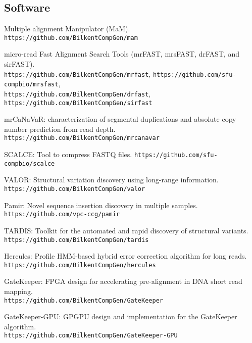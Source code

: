 \subsection{\small \sc Software}
\begin{list2}
\item
  Multiple alignment Manipulator (MaM).
  {\tt https://github.com/BilkentCompGen/mam}
\item
  micro-read Fast Alignment Search Tools (mrFAST, mrsFAST, drFAST, and sirFAST).\\
  {\tt https://github.com/BilkentCompGen/mrfast},
  {\tt https://github.com/sfu-compbio/mrsfast},\\
  {\tt https://github.com/BilkentCompGen/drfast},
  {\tt https://github.com/BilkentCompGen/sirfast}
\item
  mrCaNaVaR: characterization of segmental duplications and absolute copy number prediction from read depth.
  {\tt https://github.com/BilkentCompGen/mrcanavar}
\item
  SCALCE: Tool to compress FASTQ files. 
  {\tt https://github.com/sfu-compbio/scalce}
\item
  VALOR: Structural variation discovery using long-range information. \\
  {\tt https://github.com/BilkentCompGen/valor}
\item
  Pamir: Novel sequence insertion discovery in multiple samples.
  {\tt https://github.com/vpc-ccg/pamir}
\item
  TARDIS: Toolkit for the automated and rapid discovery of structural variants.\\
  {\tt https://github.com/BilkentCompGen/tardis}
\item
  Hercules: Profile HMM-based hybrid error correction algorithm for long reads.\\
  {\tt https://github.com/BilkentCompGen/hercules}

\item
  GateKeeper: FPGA design for accelerating pre-alignment in DNA short read mapping.\\
  {\tt https://github.com/BilkentCompGen/GateKeeper}


  
  \item
  GateKeeper-GPU: GPGPU design and implementation for the GateKeeper algorithm.\\
  {\tt https://github.com/BilkentCompGen/GateKeeper-GPU}


\end{list2}

